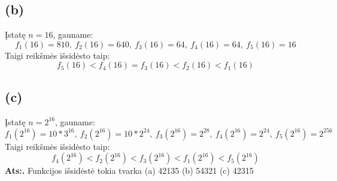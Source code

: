 \documentclass[a4paper,lithuanian]{article}
\begin{document}
\subsection*{(b)}
Įstatę $n=16$, gauname:
\[f_1(16)=810,~f_2(16)=640,~f_3(16)=64,~f_4(16)=64,~f_5(16)=16\]
Taigi reikšmės išsidėsto taip:
\[f_5(16) < f_4(16) = f_3(16) < f_2(16) < f_1(16)\]

\subsection*{(c)}
Įstatę $n=2^{16}$, gauname:
\[f_1(2^{16})=10*3^{16},~f_2(2^{16})=10*2^{24},~f_3(2^{16})=2^{28},~f_4(2^{16})=2^{24},~f_5(2^{16})=2^{256}\]
Taigi reikšmės išsidėsto taip:
\[f_4(2^{16}) < f_2(2^{16}) < f_3(2^{16}) < f_1(2^{16}) < f_5(2^{16})\]
\textbf{Ats:.} Funkcijos išsidėstė tokia tvarka (a) 42135 (b) 54321 (c) 42315
\end{document}
